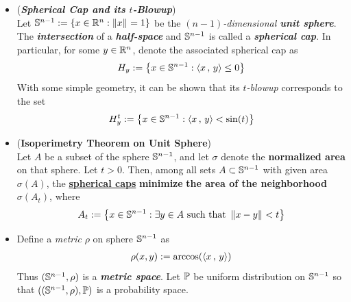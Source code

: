 \documentclass[11pt]{article}
\begin{document}
\begin{itemize}
\item \begin{definition} (\textbf{\emph{Spherical Cap and its $t$-Blowup}}) \\
Let ${\mathbb S}^{n - 1} :=  \left\{x \in {\mathbb R}^n: \left\|x\right\|_{} = 1\right\}$ be the \emph{$(n-1)$-dimensional \textbf{unit sphere}}. The \emph{\textbf{intersection}} of a \emph{\textbf{half-space}} and ${\mathbb S}^{n-1}$ is called a \emph{\textbf{spherical cap}}. In particular, for some $y \in {\mathbb R}^n$, denote the associated spherical cap as
\begin{align*}
H_y := \left\{x \in {\mathbb S}^{n-1}: \left\langle x\,,\, y \right\rangle \le 0\right\}
\end{align*} With some simple geometry, it can be shown that its  \emph{$t$-blowup}  corresponds to the set
\begin{align*}
H_y^{t} := \left\{x \in {\mathbb S}^{n-1}: \left\langle x\,,\, y \right\rangle < \sin(t)\right\}
\end{align*}
\end{definition}

\item \begin{theorem} (\textbf{Isoperimetry Theorem on Unit Sphere}) \citep{boucheron2013concentration, vershynin2018high, wainwright2019high}\\
Let $A$ be a subset of the sphere ${\mathbb S}^{n-1}$, and let $\sigma$ denote the \textbf{normalized area} on that sphere. Let $t > 0$. Then,
among all sets $A \subset {\mathbb S}^{n-1}$ with given area $\sigma(A)$, the \underline{\textbf{spherical caps}} \textbf{minimize}
\textbf{the area of the neighborhood} $\sigma(A_t)$, where
\begin{align*}
A_t := \left\{x \in {\mathbb S}^{n-1}: \exists y \in A \text{ such that } \left\|x - y\right\|_{} < t\right\}
\end{align*}
\end{theorem}

\item \begin{remark}
Define a \emph{metric} $\rho$ on sphere ${\mathbb S}^{n-1}$ as 
\begin{align*}
\rho(x, y) := \arccos(\left\langle x\,,\, y \right\rangle)
\end{align*}
Thus $({\mathbb S}^{n-1}, \rho)$ is a \emph{\textbf{metric space}}.  Let ${\mathbb P}$ be uniform distribution on ${\mathbb S}^{n-1}$ so that $(({\mathbb S}^{n-1}, \rho), {\mathbb P})$ is a probability space. 
\end{remark}




\end{itemize}
\end{document}
